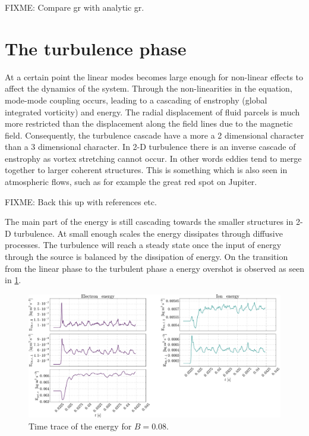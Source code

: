 FIXME: Compare gr with analytic gr.

\section{The turbulence phase}
%
At a certain point the linear modes becomes large enough for non-linear effects to affect the dynamics of the system.
Through the non-linearities in the equation, mode-mode coupling occurs, leading to a cascading of enstrophy (global integrated vorticity) and energy.
The radial displacement of fluid parcels is much more restricted than the displacement along the field lines due to the magnetic field.
Consequently, the turbulence cascade have a more a 2 dimensional character than a 3 dimensional character.
In 2-D turbulence there is an inverse cascade of enstrophy as vortex stretching cannot occur.
In other words eddies tend to merge together to larger coherent structures.
This is something which is also seen in atmospheric flows, such as for example the great red spot on Jupiter.

FIXME: Back this up with references etc.

The main part of the energy is still cascading towards the smaller structures in 2-D turbulence.
At small enough scales the energy dissipates through diffusive processes.
The turbulence will reach a steady state once the input of energy through the source is balanced by the dissipation of energy.
On the transition from the linear phase to the turbulent phase a energy overshot is observed as seen in \cref{fig:energyTrace008}.
%
\begin{figure}[htb]
    \centering
    \includegraphics[width=1.0\textwidth]{fig/results/energyTrace/energyTraceB008}
    \caption{Time trace of the energy for $B=0.08$.}
    \label{fig:energyTrace008}
\end{figure}

